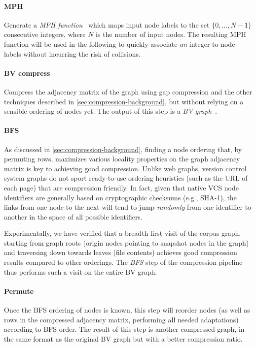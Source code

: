\paragraph{MPH}
Generate a \emph{\gls{MPH} function}~\cite{GOVFSCF} which maps input
node labels to the set $\{0,\ldots,N-1\}$ consecutive integers, where $N$ is
the number of input nodes. The resulting \gls{MPH} function will be used in the
following to quickly associate \emph{an} integer to node labels without
incurring the risk of collisions.

\paragraph{BV compress}
Compress the adjacency matrix of the graph using gap compression and the other
techniques described in \cref{sec:compression-background}, but without
relying on a sensible ordering of nodes yet. The output of this step is a
\emph{BV graph}~\cite{BoVWFI}.

\paragraph{BFS}
As discussed in \cref{sec:compression-background}, finding a node
ordering that, by permuting rows, maximizes various locality properties on the
graph adjacency matrix is key to achieving good compression. Unlike web
graphs, version control system graphs do not sport ready-to-use ordering
heuristics (such as the URL of each page) that are compression friendly. In
fact, given that native VCS node identifiers are generally based on
cryptographic checksums (e.g., SHA-1), the links from one node to the next will
tend to jump \emph{randomly} from one identifier to another in the space of all
possible identifiers.

Experimentally, we have verified that a breadth-first visit of the corpus graph,
starting from graph roots (origin nodes pointing to snapshot nodes in the
graph) and traversing down towards leaves (file contents) achieves good
compression results compared to other orderings.  The \emph{BFS} step of the
compression pipeline thus performs such a visit on the entire BV graph.

\paragraph{Permute}
Once the BFS ordering of nodes is known, this step will reorder nodes (as well
as rows in the compressed adjacency matrix, performing all needed adaptations)
according to BFS order. The result of this step is another compressed graph, in
the same format as the original BV graph but with a better compression ratio.

